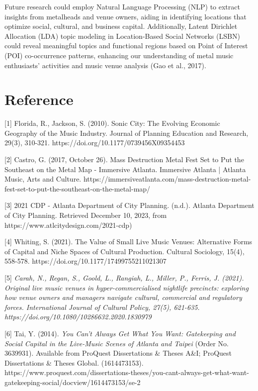 \documentclass[11pt]{article}
\begin{document}
Future research could employ Natural Language Processing (NLP) to extract insights from metalheads and venue owners, aiding in identifying locations that optimize social, cultural, and business capital. Additionally, Latent Dirichlet Allocation (LDA) topic modeling in Location-Based Social Networks (LSBN) could reveal meaningful topics and functional regions based on Point of Interest (POI) co-occurrence patterns, enhancing our understanding of metal music enthusiasts’ activities and music venue analysis (Gao et al., 2017).




\newpage

\section{Reference}

{[}1{]} Florida, R., Jackson, S. (2010). Sonic City: The Evolving Economic Geography of the Music Industry. Journal of Planning Education and Research, 29(3), 310-321. https://doi.org/10.1177/0739456X09354453

{[}2{]} Castro, G. (2017, October 26). Mass Destruction Metal Fest Set to Put the Southeast on the Metal Map - Immersive Atlanta. Immersive Atlanta | Atlanta Music, Arts and Culture. https://immersiveatlanta.com/mass-destruction-metal-fest-set-to-put-the-southeast-on-the-metal-map/

{[}3{]} 2021 CDP - Atlanta Department of City Planning. (n.d.). Atlanta Department of City Planning. Retrieved December 10, 2023, from https://www.atlcitydesign.com/2021-cdp)

{[}4{]} Whiting, S. (2021). The Value of Small Live Music Venues: Alternative Forms of Capital and Niche Spaces of Cultural Production. Cultural Sociology, 15(4), 558-578. https://doi.org/10.1177/17499755211021307

{[}5{]} \textit{Carah, N., Regan, S., Goold, L., Rangiah, L., Miller, P., Ferris, J. (2021). Original live music venues in hyper-commercialised nightlife precincts: exploring how venue owners and managers navigate cultural, commercial and regulatory forces. International Journal of Cultural Policy, 27(5), 621-635. https://doi.org/10.1080/10286632.2020.1830979}

{[}6{]} Tai, Y. (2014). \textit{You Can't Always Get What You Want: Gatekeeping and Social Capital in the Live-Music Scenes of Atlanta and Taipei} (Order No. 3639931). Available from ProQuest Dissertations \& Theses A\&I; ProQuest Dissertations \& Theses Global. (1614473153). https://www.proquest.com/dissertations-theses/you-cant-always-get-what-want-gatekeeping-social/docview/1614473153/se-2
\end{document}
